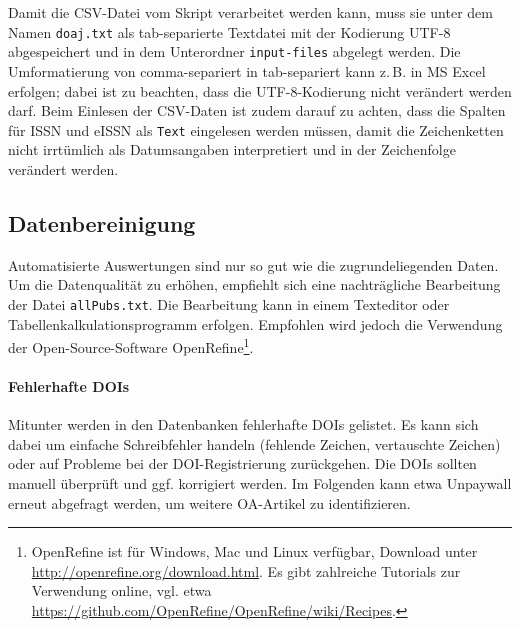 Damit die CSV-Datei vom Skript verarbeitet werden kann, muss sie unter dem Namen \texttt{doaj.txt} als tab-separierte Textdatei mit der Kodierung UTF-8 abgespeichert und in dem Unterordner \texttt{input-files} abgelegt werden. Die Umformatierung von comma-separiert in tab-separiert kann z.\,B. in MS Excel erfolgen; dabei ist zu beachten, dass die UTF-8-Kodierung nicht verändert werden darf. Beim Einlesen der CSV-Daten ist zudem darauf zu achten, dass die Spalten für ISSN und eISSN als \texttt{Text} eingelesen werden müssen, damit die Zeichenketten nicht irrtümlich als Datumsangaben interpretiert und in der Zeichenfolge verändert werden.

\subsection{Datenbereinigung} 
\label{cleanupData}

Automatisierte Auswertungen sind nur so gut wie die zugrundeliegenden Daten. Um die Datenqualität zu erhöhen, empfiehlt sich eine nachträgliche Bearbeitung der Datei \texttt{allPubs.txt}. Die Bearbeitung kann in einem Texteditor oder Tabellenkalkulationsprogramm erfolgen. Empfohlen wird jedoch die Verwendung der Open-Source-Software OpenRefine\footnote{OpenRefine ist für Windows, Mac und Linux verfügbar, Download unter \url{http://openrefine.org/download.html}. Es gibt zahlreiche Tutorials zur Verwendung online, vgl. etwa \url{https://github.com/OpenRefine/OpenRefine/wiki/Recipes}.}.

\paragraph{Fehlerhafte DOIs} Mitunter werden in den Datenbanken fehlerhafte DOIs gelistet. Es kann sich dabei um einfache Schreibfehler handeln (fehlende Zeichen, vertauschte Zeichen) oder auf Probleme bei der DOI-Registrierung zurückgehen. Die DOIs sollten manuell überprüft und ggf. korrigiert werden. Im Folgenden kann etwa Unpaywall erneut abgefragt werden, um weitere OA-Artikel zu identifizieren.

